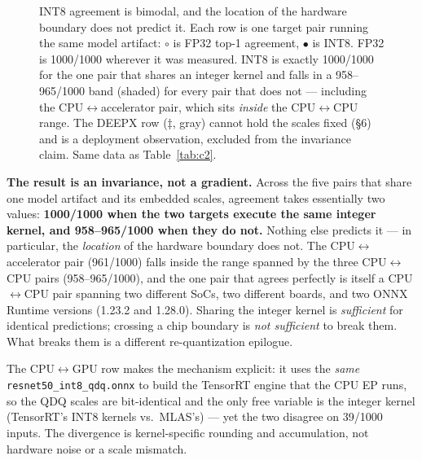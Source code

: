 \documentclass[11pt]{article}
\begin{document}
\begin{figure}[htbp]
\caption{INT8 agreement is bimodal, and the location of the hardware boundary does not predict it. Each row is one target pair running the same model artifact: $\circ$ is FP32 top-1 agreement, $\bullet$ is INT8. FP32 is 1000/1000 wherever it was measured. INT8 is exactly 1000/1000 for the one pair that shares an integer kernel and falls in a 958--965/1000 band (shaded) for every pair that does not --- including the CPU$\leftrightarrow$accelerator pair, which sits \emph{inside} the CPU$\leftrightarrow$CPU range. The DEEPX row ($\ddagger$, gray) cannot hold the scales fixed (\S6) and is a deployment observation, excluded from the invariance claim. Same data as Table~\ref{tab:c2}.}
\label{fig:c2}
\end{figure}

\textbf{The result is an invariance, not a gradient.} Across the five pairs that share one model artifact and its embedded scales, agreement takes essentially two values: \textbf{1000/1000 when the two targets execute the same integer kernel, and 958--965/1000 when they do not.} Nothing else predicts it --- in particular, the \emph{location} of the hardware boundary does not. The CPU$\leftrightarrow$accelerator pair (961/1000) falls inside the range spanned by the three CPU$\leftrightarrow$CPU pairs (958--965/1000), and the one pair that agrees perfectly is itself a CPU$\leftrightarrow$CPU pair spanning two different SoCs, two different boards, and two ONNX Runtime versions (1.23.2 and 1.28.0). Sharing the integer kernel is \emph{sufficient} for identical predictions; crossing a chip boundary is \emph{not sufficient} to break them. What breaks them is a different re-quantization epilogue.

The CPU$\leftrightarrow$GPU row makes the mechanism explicit: it uses the \emph{same} \texttt{resnet50\_int8\_qdq.onnx} to build the TensorRT engine that the CPU EP runs, so the QDQ scales are bit-identical and the only free variable is the integer kernel (TensorRT's INT8 kernels vs.\ MLAS's) --- yet the two disagree on 39/1000 inputs. The divergence is kernel-specific rounding and accumulation, not hardware noise or a scale mismatch.
\end{document}
